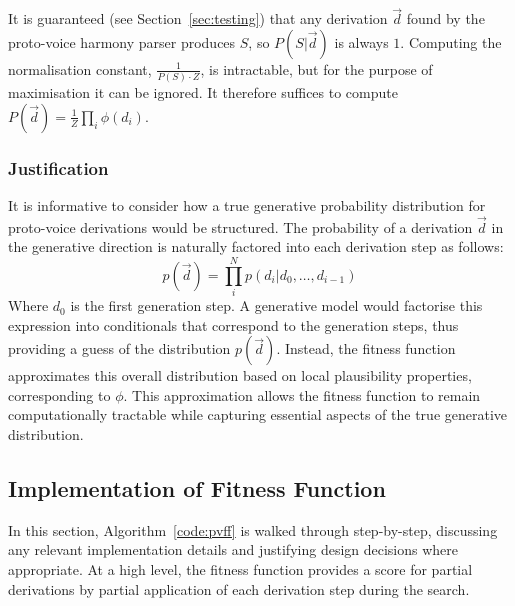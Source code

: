 \documentclass[12pt,a4paper,twoside,openany]{report} \usepackage[pdfborder={0 0 0}]{hyperref}    %
\theoremstyle{definition} \newtheorem{definition}{Definition}[section]
\begin{document}
    It is guaranteed (see Section~\ref{sec:testing}) that any derivation $\vec{d}$ found by the proto-voice harmony
    parser produces $S$, so $P(S|\vec{d})$ is always $1$. Computing the normalisation constant, $\frac{1}{P(S)\cdot
    Z}$, is intractable, but for the purpose of maximisation it can be ignored. It therefore suffices to compute
    $P(\vec{d}) = \frac{1}{Z} \prod_i \phi (d_i)$. 

    \subsubsection{Justification}

    It is informative to consider how a true generative probability distribution for proto-voice derivations would be
    structured. 
    The probability of a derivation $\vec{d}$ in the generative direction is naturally factored into each derivation step as
    follows:
    \begin{equation} 
      p(\vec{d}) = \prod_{i}^N p(d_i| d_0, \dots , d_{i-1}) 
    \end{equation}
    Where $d_0$ is the first generation step. A generative model would factorise this expression into
    conditionals that correspond to the generation steps, thus providing a guess of the distribution
    $p(\vec{d})$. Instead, the fitness function approximates this overall distribution based on local
    plausibility properties, corresponding to $\phi$. This approximation allows the fitness function to remain
    computationally tractable while capturing essential aspects of the true generative distribution.

    \subsection{Implementation of Fitness Function}
    \label{sub:heuristicImplementation}

    In this section, Algorithm~\ref{code:pvff} is walked through step-by-step, discussing any relevant implementation details and justifying
    design decisions where appropriate. 
    At a high level, the fitness function provides a score for partial derivations by partial application of each derivation step during the search. 
\end{document}
